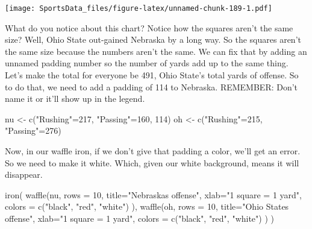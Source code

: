 \documentclass[
]{book}
\newenvironment{Shaded}{\begin{snugshade}}{\end{snugshade}}
\newcommand{\AttributeTok}[1]{\textcolor[rgb]{0.77,0.63,0.00}{#1}}
\newcommand{\DecValTok}[1]{\textcolor[rgb]{0.00,0.00,0.81}{#1}}
\newcommand{\FunctionTok}[1]{\textcolor[rgb]{0.00,0.00,0.00}{#1}}
\newcommand{\NormalTok}[1]{#1}
\newcommand{\OtherTok}[1]{\textcolor[rgb]{0.56,0.35,0.01}{#1}}
\newcommand{\StringTok}[1]{\textcolor[rgb]{0.31,0.60,0.02}{#1}}
\begin{document}
\texttt{[image: SportsData\_files/figure-latex/unnamed-chunk-189-1.pdf]}

What do you notice about this chart? Notice how the squares aren't the same size? Well, Ohio State out-gained Nebraska by a long way. So the squares aren't the same size because the numbers aren't the same. We can fix that by adding an unnamed padding number so the number of yards add up to the same thing. Let's make the total for everyone be 491, Ohio State's total yards of offense. So to do that, we need to add a padding of 114 to Nebraska. REMEMBER: Don't name it or it'll show up in the legend.

\begin{Shaded}
\begin{Highlighting}[]
\NormalTok{nu }\OtherTok{\textless{}{-}} \FunctionTok{c}\NormalTok{(}\StringTok{"Rushing"}\OtherTok{=}\DecValTok{217}\NormalTok{, }\StringTok{"Passing"}\OtherTok{=}\DecValTok{160}\NormalTok{, }\DecValTok{114}\NormalTok{)}
\NormalTok{oh }\OtherTok{\textless{}{-}} \FunctionTok{c}\NormalTok{(}\StringTok{"Rushing"}\OtherTok{=}\DecValTok{215}\NormalTok{, }\StringTok{"Passing"}\OtherTok{=}\DecValTok{276}\NormalTok{)}
\end{Highlighting}
\end{Shaded}

Now, in our waffle iron, if we don't give that padding a color, we'll get an error. So we need to make it white. Which, given our white background, means it will disappear.

\begin{Shaded}
\begin{Highlighting}[]
\FunctionTok{iron}\NormalTok{(}
 \FunctionTok{waffle}\NormalTok{(nu, }
        \AttributeTok{rows =} \DecValTok{10}\NormalTok{, }
        \AttributeTok{title=}\StringTok{"Nebraska\textquotesingle{}s offense"}\NormalTok{, }
        \AttributeTok{xlab=}\StringTok{"1 square = 1 yard"}\NormalTok{, }
        \AttributeTok{colors =} \FunctionTok{c}\NormalTok{(}\StringTok{"black"}\NormalTok{, }\StringTok{"red"}\NormalTok{, }\StringTok{"white"}\NormalTok{)}
\NormalTok{        ),}
 \FunctionTok{waffle}\NormalTok{(oh, }
        \AttributeTok{rows =} \DecValTok{10}\NormalTok{, }
        \AttributeTok{title=}\StringTok{"Ohio State\textquotesingle{}s offense"}\NormalTok{, }
        \AttributeTok{xlab=}\StringTok{"1 square = 1 yard"}\NormalTok{, }
        \AttributeTok{colors =} \FunctionTok{c}\NormalTok{(}\StringTok{"black"}\NormalTok{, }\StringTok{"red"}\NormalTok{, }\StringTok{"white"}\NormalTok{)}
\NormalTok{        )}
\NormalTok{)}
\end{Highlighting}
\end{Shaded}
\end{document}
